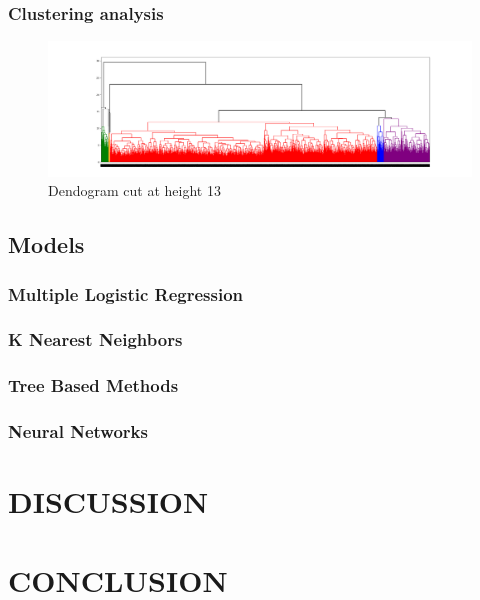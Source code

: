 \documentclass[%
 aapm,
 mph,%
 amsmath,amssymb,
 reprint,%
]{revtex4-2}
\begin{document}
\subsubsection{\label{Clustering}Clustering analysis}

\begin{figure}[t]
    \centering
    \includegraphics[width=\textwidth]{Plots/Dendrogram.png}
    \caption{Dendogram cut at height 13}
    \label{fig:dendogram}
\end{figure}
\subsection{\label{sec:models}Models}
\subsubsection{\label{sec:GLM}Multiple Logistic Regression}

\subsubsection{\label{sec:KNN}K Nearest Neighbors}



\subsubsection{\label{sec:Trees}Tree Based Methods}

\subsubsection{\label{sec:NN}Neural Networks}


\section{DISCUSSION}



\section{CONCLUSION}

\end{document}
